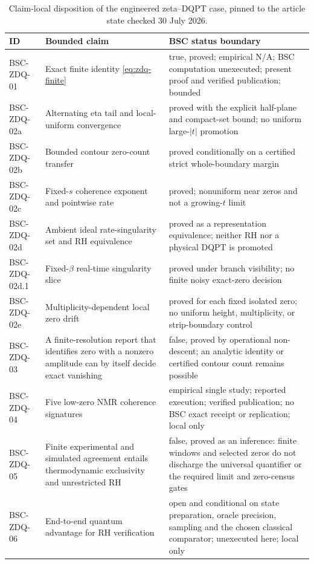 \documentclass[11pt,a4paper]{article}
\theoremstyle{definition}
\theoremstyle{plain}
\theoremstyle{remark}
\begin{document}
\begin{table}[htbp]
\centering
\scriptsize
\caption{Claim-local disposition of the engineered zeta--DQPT case, pinned to
the article state checked 30 July 2026.}\label{tab:zdq-status}
\begin{tabularx}{\textwidth}{L{0.13\textwidth}L{0.43\textwidth}Y}
\toprule
ID & Bounded claim & BSC status boundary\\
\midrule
BSC-ZDQ-01 & Exact finite identity \eqref{eq:zdq-finite} &
true, proved; empirical N/A; BSC computation unexecuted; present proof and
verified publication; bounded\\
BSC-ZDQ-02a & Alternating eta tail and local-uniform convergence &
proved with the explicit half-plane and compact-set bound; no uniform
large-\(|t|\) promotion\\
BSC-ZDQ-02b & Bounded contour zero-count transfer &
proved conditionally on a certified strict whole-boundary margin\\
BSC-ZDQ-02c & Fixed-\(s\) coherence exponent and pointwise rate &
proved; nonuniform near zeros and not a growing-\(t\) limit\\
BSC-ZDQ-02d & Ambient ideal rate-singularity set and RH equivalence &
proved as a representation equivalence; neither RH nor a physical DQPT is
promoted\\
BSC-ZDQ-02d.1 & Fixed-\(\beta\) real-time singularity slice &
proved under branch visibility; no finite noisy exact-zero decision\\
BSC-ZDQ-02e & Multiplicity-dependent local zero drift &
proved for each fixed isolated zero; no uniform height, multiplicity, or
strip-boundary control\\
BSC-ZDQ-03 & A finite-resolution report that identifies zero with a nonzero
amplitude can by itself decide exact vanishing & false, proved by operational
non-descent; an analytic identity or certified contour count remains possible\\
BSC-ZDQ-04 & Five low-zero NMR coherence signatures &
empirical single study; reported execution; verified publication; no BSC exact
receipt or replication; local only\\
BSC-ZDQ-05 & Finite experimental and simulated agreement entails
thermodynamic exclusivity and unrestricted RH & false, proved as an inference:
finite windows and selected zeros do not discharge the universal quantifier or
the required limit and zero-census gates\\
BSC-ZDQ-06 & End-to-end quantum advantage for RH verification &
open and conditional on state preparation, oracle precision, sampling and the
chosen classical comparator; unexecuted here; local only\\
\bottomrule
\end{tabularx}
\end{table}
\end{document}
